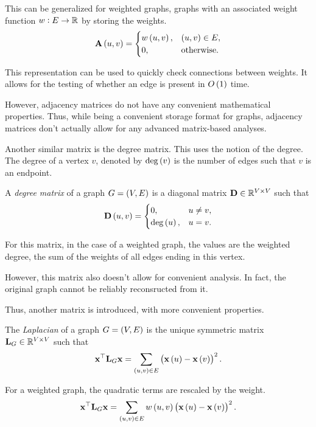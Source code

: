 \documentclass[11pt]{article}
\renewcommand\vec{\V}
\begin{document}
This can be generalized for weighted graphs,
graphs with an associated weight function $w:E\to\mathbb R$ by storing the weights.
$$\V{A}\paren{u,v}=\begin{cases}w\paren{u,v},&\paren{u,v}\in E,\\
0,&\text{otherwise}.\end{cases}$$

This representation can be used to quickly check connections between weights.
It allows for the testing of whether an edge is present in $O\paren{1}$ time.

However, adjacency matrices do not have any convenient mathematical properties.
Thus, while being a convenient storage format for graphs,
adjacency matrices don't actually allow for any advanced matrix-based analyses.

Another similar matrix is the degree matrix.
This uses the notion of the degree.
The degree of a vertex $v$, denoted by $\deg\paren{v}$
is the number of edges such that $v$ is an endpoint.
\begin{definition}
A \emph{degree matrix} of a graph $G=\paren{V,E}$
is a diagonal matrix $\V{D}\in\rea^{V\times V}$ such that
$$\V{D}\paren{u,v}=\begin{cases}0,&u\neq v,\\\deg\paren{u},&u=v.\end{cases}$$
\end{definition}

For this matrix, in the case of a weighted graph,
the values are the weighted degree,
the sum of the weights of all edges ending in this vertex.

However, this matrix also doesn't allow for convenient analysis.
In fact, the original graph cannot be reliably reconsructed from it.

Thus, another matrix is introduced, with more convenient properties.
\begin{definition}
The \emph{Laplacian} of a graph $G=\paren{V,E}$
is the unique symmetric matrix $\V{L}_{G}\in\rea^{V\times V}$ such that
$$\V{x}^{\top}\V{L}_{G}\V{x}
=\sum\limits_{\paren{u,v}\in E}\paren{\V{x}\paren{u}-\V{x}\paren{v}}^2.$$
\end{definition}

For a weighted graph, the quadratic terms are rescaled by the weight.
$$\vec{x}^{\top}\V{L}_{G}\vec{x}
=\sum\limits_{\paren{u,v}\in E}w\paren{u,v}
\paren{\vec{x}\paren{u}-\vec{x}\paren{v}}^2.$$

\newcommand\colvec[1]{\begin{pmatrix}#1\end{pmatrix}}
\end{document}
